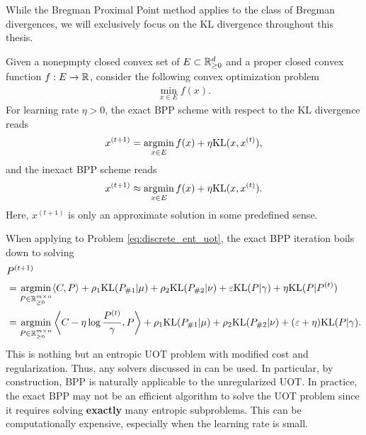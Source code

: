While the Bregman Proximal Point method \citep{Chen93} applies to the class of Bregman divergences,
we will exclusively focus on the KL divergence throughout this thesis.
\begin{definition}
  Given a nonepmpty closed convex set of $E \subset \mathbb R^d_{\geq 0}$
  and a proper closed convex function $f: E \to \mathbb R$, consider the following
  convex optimization problem
  \begin{align}
    \min_{x \in E} f(x).
  \end{align}
  For learning rate $\eta > 0$, the exact BPP scheme with respect to the KL divergence reads
  \begin{align}
    \label{eq:bppa}
    x^{(t+1)} = \operatorname*{argmin}_{x \in E} f(x) + \eta \text{KL}(x, x^{(t)}),
  \end{align}
  and the inexact BPP scheme reads
  \begin{align}
    \label{eq:bppa_inexact}
    x^{(t+1)} \approx \operatorname*{argmin}_{x \in E} f(x) + \eta \text{KL}(x, x^{(t)}).
  \end{align}
  Here, $x^{(t+1)}$ is only an approximate solution in some predefined sense.
\end{definition}
When applying to Problem \eqref{eq:discrete_ent_uot}, the exact BPP iteration boils down to solving
\begin{align}
\label{eq:bpp_uot}
  &P^{(t+1)} \\
  &= \operatorname*{argmin}_{P \in \mathbb R^{m \times n}_{\geq 0}}
  \langle C, P \rangle + \rho_1 \text{KL}(P_{\# 1} | \mu)
  + \rho_2 \text{KL}(P_{\# 2} | \nu) + \varepsilon \text{KL}(P | \gamma) + \eta \text{KL}(P | P^{(t)}) \\
  &= \operatorname*{argmin}_{P \in \mathbb R^{m \times n}_{\geq 0}}
  \left \langle C - \eta \log \frac{P^{(t)}}{\gamma}, P \right \rangle
  + \rho_1 \text{KL}(P_{\# 1} | \mu) + \rho_2 \text{KL}(P_{\# 2} | \nu) + (\varepsilon + \eta) \text{KL}(P | \gamma).
\end{align}
This is nothing but an entropic UOT problem with modified cost and regularization.
Thus, any solvers discussed in  can be used. In particular,
by construction, BPP is naturally applicable to the unregularized UOT.
In practice, the exact BPP may not be an efficient algorithm to solve the UOT problem since
it requires solving \textbf{exactly} many entropic subproblems. This can be computationally expensive,
especially when the learning rate is small.

